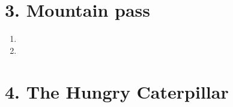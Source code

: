 \documentclass[11pt]{article}
\begin{document}
\newpage
\section*{3. Mountain pass}
\begin{enumerate}[label=(\alph*)]
\item




\item






\end{enumerate}



\newpage
\section*{4. The Hungry Caterpillar}
\end{document}
